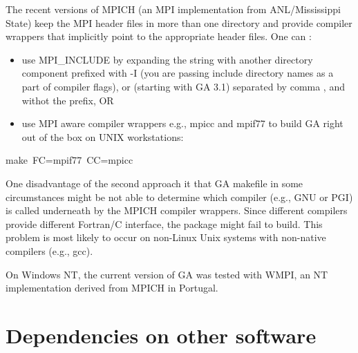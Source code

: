The recent versions of MPICH (an MPI implementation from ANL/Mississippi
State) keep the MPI header files in more than one directory and provide
compiler wrappers that implicitly point to the appropriate header
files. One can :
\begin{itemize}
\item use MPI\_INCLUDE by expanding the string with another directory component
prefixed with \textquotedbl{}-I\textquotedbl{} (you are passing include
directory names as a part of compiler flags), or (starting with GA
3.1) separated by comma \textquotedbl{},\textquotedbl{} and withot
the prefix, OR 
\item use MPI aware compiler wrappers e.g., mpicc and mpif77 to build GA
right out of the box on UNIX workstations: \end{itemize}
\begin{lyxcode}
make~FC=mpif77~CC=mpicc~
\end{lyxcode}
One disadvantage of the second approach it that GA makefile in some
circumstances might be not able to determine which compiler (e.g.,
GNU or PGI) is called underneath by the MPICH compiler wrappers. Since
different compilers provide different Fortran/C interface, the package
might fail to build. This problem is most likely to occur on non-Linux
Unix systems with non-native compilers (e.g., gcc).

On Windows NT, the current version of GA was tested with WMPI, an
NT implementation derived from MPICH in Portugal. 


\section{Dependencies on other software }

